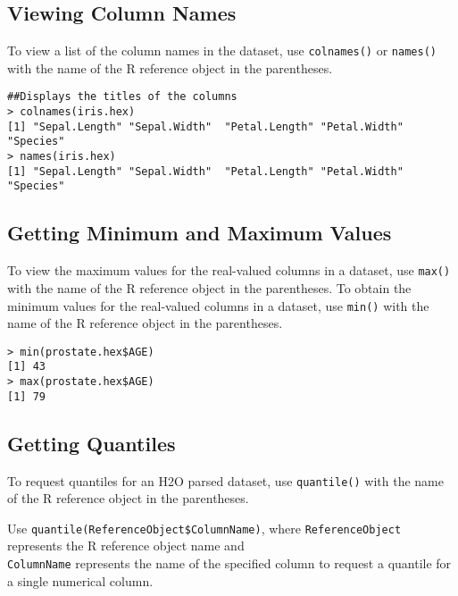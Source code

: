 {{\waterExampleInR
\medskip


\subsection{Viewing Column Names}
To view a list of the column names in the dataset, use {\texttt{colnames()}} or {\texttt{names()}} with the name of the R reference object in the parentheses.
\newpage
\waterExampleInR
\medskip

\begin{lstlisting}[style=R]
##Displays the titles of the columns
> colnames(iris.hex)
[1] "Sepal.Length" "Sepal.Width"  "Petal.Length" "Petal.Width"  "Species"
> names(iris.hex)
[1] "Sepal.Length" "Sepal.Width"  "Petal.Length" "Petal.Width"  "Species"
\end{lstlisting}

\subsection{Getting Minimum and Maximum Values}

To view the maximum values for the real-valued columns in a dataset, use {\texttt{max()}} with the name of the R reference object in the parentheses.
To obtain the minimum values for the real-valued columns in a dataset, use {\texttt{min()}} with the name of the R reference object in the parentheses.

\waterExampleInR
\medskip

\begin{lstlisting}[style=R]
> min(prostate.hex$AGE)
[1] 43
> max(prostate.hex$AGE)
[1] 79
\end{lstlisting}

\subsection{Getting Quantiles}

To request quantiles for an H2O parsed dataset, use {\texttt{quantile()}} with the name of the R reference object in the parentheses.

Use  {\texttt{quantile(ReferenceObject\$ColumnName)}},  where {\texttt{ReferenceObject}} represents the R reference object name and \\{\texttt{ColumnName}} represents the name of the specified column to request a quantile for a single numerical column.

}}
